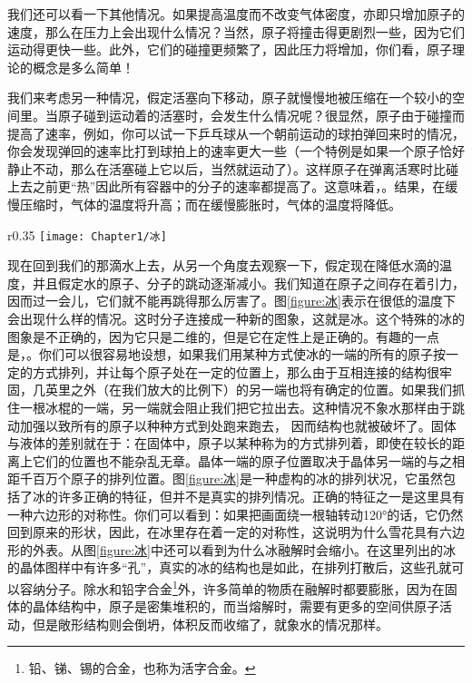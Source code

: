 我们还可以看一下其他情况。如果提高温度而不改变气体密度，亦即只增加原子的速度，那么在压力上会出现什么情况？当然，原子将撞击得更剧烈一些，因为它们运动得更快一些。此外，它们的碰撞更频繁了，因此压力将增加，你们看，原子理论的概念是多么简单！

我们来考虑另一种情况，假定活塞向下移动，原子就慢慢地被压缩在一个较小的空间里。当原子碰到运动着的活塞时，会发生什么情况呢？很显然，原子由于碰撞而提高了速率，例如，你可以试一下乒乓球从一个朝前运动的球拍弹回来时的情况，你会发现弹回的速率比打到球拍上的速率更大一些（一个特例是如果一个原子恰好静止不动，那么在活塞碰上它以后，当然就运动了）。这样原子在弹离活寒时比碰上去之前更“热”因此所有容器中的分子的速率都提高了。这意味着，。结果，在缓慢压缩时，气体的温度将升高；而在缓慢膨胀时，气体的温度将降低。

\begin{wrapfigure}{r}{0.35\textwidth}
    \centering
    \texttt{[image: Chapter1/冰]}
    \caption{冰}
    \label{figure:冰}
\end{wrapfigure}
现在回到我们的那滴水上去，从另一个角度去观察一下，假定现在降低水滴的温度，并且假定水的原子、分子的跳动逐渐减小。我们知道在原子之间存在着引力，因而过一会儿，它们就不能再跳得那么厉害了。图\ref{figure:冰}表示在很低的温度下会出现什么样的情况。这时分子连接成一种新的图象，这就是冰。这个特殊的冰的图象是不正确的，因为它只是二维的，但是它在定性上是正确的。有趣的一点是，。你们可以很容易地设想，如果我们用某种方式使冰的一端的所有的原子按一定的方式排列，并让每个原子处在一定的位置上，那么由于互相连接的结构很牢固，几英里之外（在我们放大的比例下）的另一端也将有确定的位置。如果我们抓住一根冰棍的一端，另一端就会阻止我们把它拉出去。这种情况不象水那样由于跳动加强以致所有的原子以种种方式到处跑来跑去， 因而结构也就被破坏了。固体与液体的差别就在于：在固体中，原子以某种称为的方式排列着，即使在较长的距离上它们的位置也不能杂乱无章。晶体一端的原子位置取决于晶体另一端的与之相距千百万个原子的排列位置。图\ref{figure:冰}是一种虚构的冰的排列状况，它虽然包括了冰的许多正确的特征，但并不是真实的排列情况。正确的特征之一是这里具有一种六边形的对称性。你们可以看到：如果把画面绕一根轴转动120°的话，它仍然回到原来的形状，因此，在冰里存在着一定的对称性，这说明为什么雪花具有六边形的外表。从图\ref{figure:冰}中还可以看到为什么冰融解时会缩小。在这里列出的冰的晶体图样中有许多“孔”，真实的冰的结构也是如此，在排列打散后，这些孔就可以容纳分子。除水和铅字合金\footnote{铅、锑、锡的合金，也称为活字合金。}外，许多简单的物质在融解时都要膨胀，因为在固体的晶体结构中，原子是密集堆积的，而当熔解时，需要有更多的空间供原子活动，但是敞形结构则会倒坍，体积反而收缩了，就象水的情况那样。

